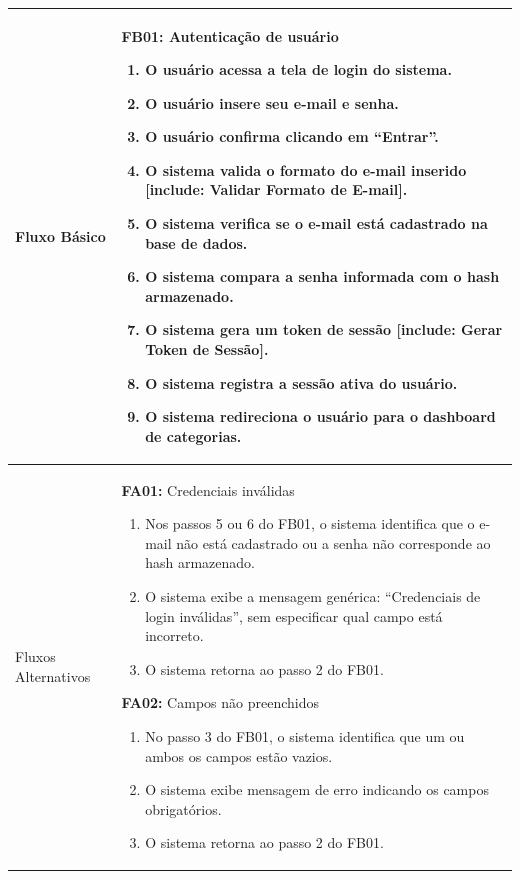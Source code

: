 \begin{longtable}{ >{\raggedright}p{2.8cm} | >{\raggedright\arraybackslash}p{10.7cm} }
Fluxo Básico & \mbox{}
\textbf{FB01:} Autenticação de usuário
\vspace{2pt}
\begin{enumerate}[nosep,leftmargin=1.2em,topsep=0pt,partopsep=0pt,parsep=0pt,itemsep=0pt,after=\vspace{2pt}]
    \item O usuário acessa a tela de login do sistema.
    \item O usuário insere seu e-mail e senha.
    \item O usuário confirma clicando em ``Entrar''.
    \item O sistema valida o formato do e-mail inserido [include: Validar Formato de E-mail].
    \item O sistema verifica se o e-mail está cadastrado na base de dados.
    \item O sistema compara a senha informada com o hash armazenado.
    \item O sistema gera um token de sessão [include: Gerar Token de Sessão].
    \item O sistema registra a sessão ativa do usuário.
    \item O sistema redireciona o usuário para o dashboard de categorias.
\end{enumerate}
\mbox{} \\ \hline

Fluxos Alternativos & \mbox{}
\textbf{FA01:} Credenciais inválidas
\vspace{2pt}
\begin{enumerate}[nosep,leftmargin=1.2em,topsep=0pt,partopsep=0pt,parsep=0pt,itemsep=0pt,after=\vspace{2pt}]
    \item Nos passos 5 ou 6 do FB01, o sistema identifica que o e-mail não está cadastrado ou a senha não corresponde ao hash armazenado.
    \item O sistema exibe a mensagem genérica: ``Credenciais de login inválidas'', sem especificar qual campo está incorreto.
    \item O sistema retorna ao passo 2 do FB01.
\end{enumerate}

\textbf{FA02:} Campos não preenchidos
\vspace{2pt}
\begin{enumerate}[nosep,leftmargin=1.2em,topsep=0pt,partopsep=0pt,parsep=0pt,itemsep=0pt,after=\vspace{2pt}]
    \item No passo 3 do FB01, o sistema identifica que um ou ambos os campos estão vazios.
    \item O sistema exibe mensagem de erro indicando os campos obrigatórios.
    \item O sistema retorna ao passo 2 do FB01.
\end{enumerate}


\end{longtable}

